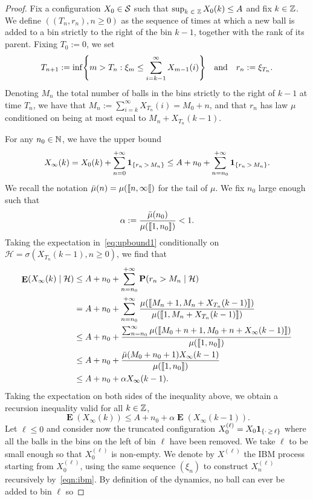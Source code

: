\documentclass[AHL,Unicode,longabstracts,published]{cedram}
\DeclareMathOperator{\E}{\mathbf{E}}
\newcommand{\bbN}{\mathbb{N}}
\newcommand{\Z}{\mathbb{Z}}
\newcommand{\ind}[1]{\mathbf{1}_{\left\{#1\right\}}}
\renewcommand{\P}{\mathbf{P}}
\renewcommand{\S}{\mathcal{S}}
\newcommand{\clH}{\mathcal{H}}
\let\originalleft\left
\let\originalright\right
\renewcommand{\left}{\mathopen{}\mathclose\bgroup\originalleft}
\renewcommand{\right}{\aftergroup\egroup\originalright}
\let\oldin\in
\renewcommand{\in}{\mathchoice{\oldin}{\oldin}{\,\oldin\,}{\,\oldin\,}}
\newcommand{\llbracket}{\mathopen{[\mkern -2.7mu[}}
\newcommand{\rrbracket}{\mathclose{]\mkern -2.7mu]}}
\newcommand{\llbracketclose}{\mathclose{[\mkern -2.7mu[}}
\newcommand{\llb}{\llbracket}
\newcommand{\rrb}{\rrbracket}
\newcommand{\Z}{\mathbb{Z}}
\begin{document}
\begin{proof}
Fix a configuration $X_0 \in \S$ such that $\sup_{k \in \Z} X_0(k) \leq A$ and fix $k\in \Z$. We define $((T_n,r_n), n \geq 0)$ as the sequence of times at which a new ball is added to a bin strictly to the right of the bin $k-1$, together with the rank of its parent. Fixing $T_0
:= 0$, we set
\[
T_{n+1}
:= \inf\left\{m > T_n : \xi_m \leq \sum_{i=k-1}^\infty X_{m-1}(i) \right\} \quad \text{and} \quad r_n
:= \xi_{T_n}.
\]
Denoting $M_n$ the total number of balls in the bins strictly to the right of $k-1$ at time $T_n$, we have that $M_n
:= \sum_{i=k}^\infty X_{T_n}(i) = M_0 + n$, and that $r_n$ has law $\mu$ conditioned on being at most equal to $M_n + X_{T_{n}}(k-1)$.

For any $n_0 \in \bbN$, we have the upper bound
\begin{equation}\label{eq:upbound1}
X_{\infty}(k) = X_0(k) + \sum_{n=0}^{+\infty} \ind{r_n\,>\, M_n} \leq A + n_0 + \sum_{n=n_0}^{+\infty} \ind{r_n\,>\,M_n}.
\end{equation}
We recall the notation $\bar{\mu}(n) = \mu(\llb n,\infty\llbracketclose)$ for the tail of $\mu$. We fix $n_0$ large enough such that
\[
\alpha
:= \frac{\bar{\mu}(n_0)}{\mu(\llb 1,n_0\rrb)} < 1.
\]
Taking the expectation in~\eqref{eq:upbound1} conditionally on $\clH = \sigma(X_{T_n}(k-1), n \geq 0)$, we find that
\begin{align*}
\E(X_\infty(k) \mid \clH) & \leq A + n_0 + \sum_{n=n_0}^{+\infty} \P(r_n > M_n \mid \clH)\\
& = A + n_0 + \sum_{n=n_0}^{+\infty} \frac{\mu(\llb M_n+1,M_n+X_{T_n}(k-1)\rrb)}{\mu(\llb 1,M_n+X_{T_n}(k-1)\rrb)}\\
& \leq A + n_0 + \frac{\sum_{n=n_0}^\infty \mu(\llb M_0 + n + 1,M_0 + n + X_{\infty}(k-1)\rrb)}{\mu(\llb 1,n_0 \rrb)} \\
& \leq A + n_0 + \frac{\bar{\mu}(M_0 + n_0 + 1) X_\infty(k-1)}{\mu(\llb 1,n_0 \rrb)} \\
& \leq A + n_0 + \alpha X_\infty(k-1).
\end{align*}
Taking the expectation on both sides of the inequality above, we obtain a recursion inequality valid for all $k\in \Z$,
\begin{equation}\label{eq:recbounded}
\E(X_\infty(k)) \leq A + n_0 + \alpha \E(X_\infty(k-1)).
\end{equation}
Let $\ell\leq0$ and consider now the truncated configuration $X^{(\ell)}_0 = X_0 \ind{\cdot\,\geq\,\ell}$ where all the balls in the bins on the left of bin $\ell$ have been removed. We take $\ell$ to be small enough so that $X^{(\ell)}_0$ is non-empty. We denote by $X^{(\ell)}$ the IBM process starting from $X^{(\ell)}_0$, using the same sequence $(\xi_n)$ to construct $X^{(\ell)}_n$ recursively by~\eqref{eqn:ibm}. By definition of the dynamics, no ball can ever be added to bin $\ell$ so

\end{proof}
\end{document}
